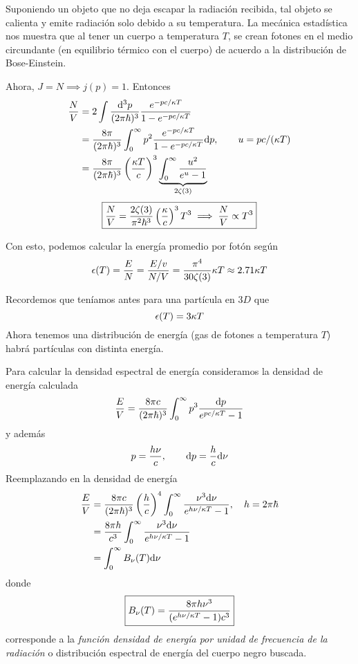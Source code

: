 \begin{sol}
Suponiendo un objeto que no deja escapar la radiación recibida, tal objeto se calienta y emite radiación solo debido a su temperatura. La mecánica estadística nos muestra que al tener un cuerpo a temperatura $T$, se crean fotones en el medio circundante (en equilibrio térmico con el cuerpo) de acuerdo a la distribución de Bose-Einstein.

Ahora, $J=N\implies j(p )=1$. Entonces
\begin{align}
  \frac{N}{V}&=2\int\frac{\dd^3p}{(2\pi\hbar)^3}\frac{e^{-pc/\kappa T}}{1-e^{-pc/\kappa T}}\\
  &=\frac{8\pi }{(2\pi\hbar)^3}\int_0^\infty p^2\frac{e^{-pc/\kappa T}}{1-e^{-pc/\kappa T}}\dd p,\qquad u=pc/(\kappa T)\\
  &=\frac{8\pi }{(2\pi\hbar)^3}\left(\frac{\kappa T}{c}\right)^3\underbrace{\int_0^\infty \frac{u^2}{e^u-1}}_{2\zeta (3)}
\end{align}
\begin{equation}
  \boxed{\frac{N}{V}=\frac{2\zeta(3)}{\pi^2\hbar^3}\left(\frac{\kappa }{c}\right)^3T^3\implies \frac{N}{V}\propto T^3}
\end{equation}

Con esto, podemos calcular la energía promedio por fotón según
\begin{equation}
  \epsilon(T)=\frac{E}{N}=\frac{E/v}{N/V}=\frac{\pi^4}{30\zeta(3)}\kappa T\approx 2.71 \kappa T
\end{equation}

Recordemos que teníamos antes para una partícula en $3D$ que
\begin{equation}
  \epsilon (T)=3\kappa T 
\end{equation}
Ahora tenemos una distribución de energía (gas de fotones a temperatura $T$) habrá partículas con distinta energía.

Para calcular la densidad espectral de energía consideramos la densidad de energía calculada
\begin{equation}
  \frac{E}{V}=\frac{8\pi c}{(2\pi\hbar)^3}\int_0^\infty p^3\frac{\dd p}{e^{pc/\kappa T}-1}
\end{equation}
y además
\begin{equation}
  p=\frac{h\nu }{c},\qquad \dd p=\frac{h}{c}\dd\nu 
\end{equation}
Reemplazando en la densidad de energía
\begin{align}
  \frac{E}{V}&=\frac{8\pi c}{(2\pi\hbar)^3}\left(\frac{h}{c}\right)^4\int_0^\infty\frac{\nu^3\dd\nu }{e^{h\nu /\kappa T}-1},\quad h=2\pi \hbar\\
  &=\frac{8\pi h}{c^3}\int_0^\infty\frac{\nu^3\dd\nu }{e^{h\nu /\kappa T}-1}\\
  &=\int_0^\infty B_\nu (T)\dd\nu 
\end{align}
donde 
\begin{equation}
 \boxed{ B_\nu (T)=\frac{8\pi h\nu^3}{(e^{h\nu /\kappa T}-1)c^3}}
\end{equation}
corresponde a la \textit{función densidad de energía por unidad de frecuencia de la radiación} o distribución espectral de energía del cuerpo negro buscada.


\end{sol}
